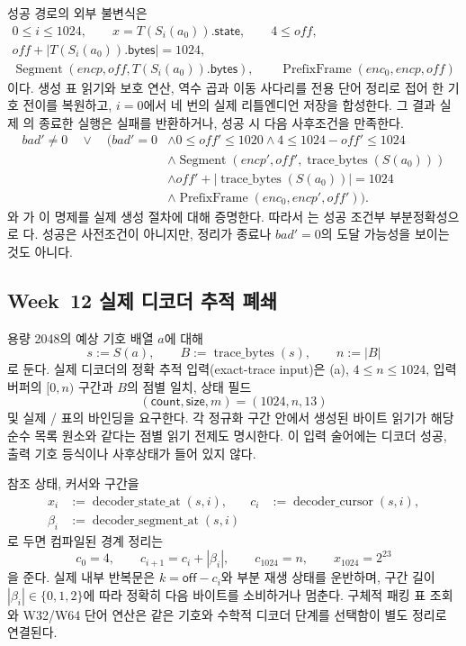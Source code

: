 성공 경로의 외부 불변식은
\[
\begin{gathered}
  0\le i\le1024,\qquad
  x=T(S_i(a_0)).\mathsf{state},\qquad 4\le off,\\
  off+|T(S_i(a_0)).\mathsf{bytes}|=1024,\\
  \operatorname{Segment}(encp,off,T(S_i(a_0)).\mathsf{bytes}),\qquad
  \operatorname{PrefixFrame}(enc_0,encp,off)
\end{gathered}
\]
이다. 생성 표 읽기와 보호 연산, 역수 곱과 이동 사다리를 전용 단어 정리로
접어 한 기호 전이를 복원하고, \(i=0\)에서 네 번의 실제 리틀엔디언 저장을
합성한다. 그 결과 실제 의 종료한 실행은 실패를
반환하거나, 성공 시 다음 사후조건을 만족한다.
\[
\begin{aligned}
 bad'\ne0\quad\lor\quad\bigl(bad'=0
 &\land 0\le off'\le1020
 \land 4\le1024-off'\le1024\\
 &\land\operatorname{Segment}(encp',off',
       \operatorname{trace\_bytes}(S(a_0)))\\
 &\land off'+|\operatorname{trace\_bytes}(S(a_0))|=1024\\
 &\land\operatorname{PrefixFrame}(enc_0,encp',off')\bigr).
\end{aligned}
\]
와
가 이 명제를 실제 생성 절차에
대해 증명한다. 따라서 는 성공 조건부
부분정확성으로 \statusproved 다. 성공은 사전조건이 아니지만, 정리가 종료나
\(bad'=0\)의 도달 가능성을 보이는 것도 아니다.

\subsection{Week~12 실제 디코더 추적 폐쇄}

용량 2048의 예상 기호 배열 \(a\)에 대해
\[
  s:=S(a),\qquad B:=\operatorname{trace\_bytes}(s),\qquad n:=|B|
\]
로 둔다. 실제 디코더의 정확 추적 입력(exact-trace input)은
(a), \(4\le n\le1024\), 입력 버퍼의
\([0,n)\) 구간과 \(B\)의 점별 일치, 상태 필드
\[
  (\mathsf{count},\mathsf{size},m)=(1024,n,13)
\]
및 실제 / 표의 바인딩을
요구한다. 각 정규화 구간 안에서 생성된 바이트 읽기가 해당 순수 목록 원소와
같다는 점별 읽기 전제도 명시한다. 이 입력 술어에는 디코더 성공, 출력 기호
등식이나 사후상태가 들어 있지 않다.

참조 상태, 커서와 구간을
\[
\begin{aligned}
  x_i&:=\operatorname{decoder\_state\_at}(s,i),&
  c_i&:=\operatorname{decoder\_cursor}(s,i),\\
  \beta_i&:=\operatorname{decoder\_segment\_at}(s,i)
\end{aligned}
\]
로 두면 컴파일된 경계 정리는
\[
  c_0=4,\qquad c_{i+1}=c_i+|\beta_i|,\qquad
  c_{1024}=n,\qquad x_{1024}=2^{23}
\]
을 준다. 실제 내부 반복문은
\(k=\mathsf{off}-c_i\)와 부분 재생 상태를 운반하며, 구간 길이
\(|\beta_i|\in\{0,1,2\}\)에 따라 정확히 다음 바이트를 소비하거나 멈춘다.
구체적 패킹 표 조회와 W32/W64 단어 연산은 같은 기호와 수학적 디코더 단계를
선택함이 별도 정리로 연결된다.

